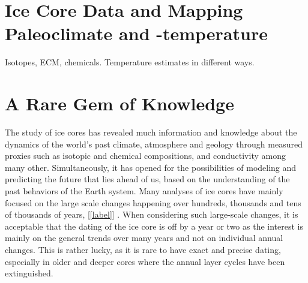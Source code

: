 \documentclass[../../CompleteThesis2/Complete_2ndDraft]{subfiles}
\begin{document}
	
	\section[Ice Core Data]{Ice Core Data and Mapping Paleoclimate and -temperature}
	Isotopes, ECM, chemicals. Temperature estimates in different ways.
	
	\section[A Rare Gem]{A Rare Gem of Knowledge}
	The study of ice cores has revealed much information and knowledge about the dynamics of the world's past climate, atmosphere and geology through measured proxies such as isotopic and chemical compositions, and conductivity among many other. Simultaneously, it has opened for the possibilities of modeling and predicting the future that lies ahead of us, based on the understanding of the past behaviors of the Earth system. Many analyses of ice cores have mainly focused on the large scale changes happening over hundreds, thousands and tens of thousands of years, [\ref{label}] .	When considering such large-scale changes, it is acceptable that the dating of the ice core is off by a year or two as the interest is mainly on the general trends over many years and not on individual annual changes. This is rather lucky, as it is rare to have exact and precise dating, especially in older and deeper cores where the annual layer cycles have been extinguished. 
\end{document}
